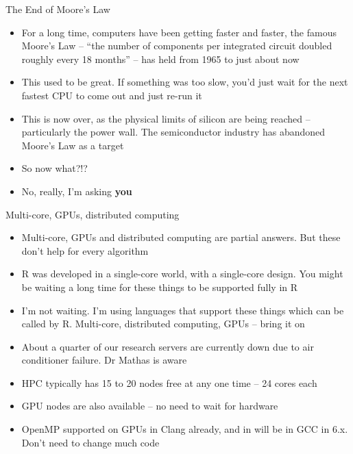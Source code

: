 \documentclass{beamer}
\begin{document}
\begin{frame}{The End of Moore's Law}
\begin{itemize}
\item For a long time, computers have been getting faster and faster, the famous
			Moore's Law -- ``the number of components per integrated circuit doubled roughly every 18 months'' -- 
			has held from 1965 to just about now
\item This used to be great. If something was too slow, you'd just wait for the next fastest CPU to come out
			and just re-run it
\item This is now over, as the physical limits of silicon are being reached -- particularly the power wall. 
			The semiconductor industry has abandoned Moore's Law as a target
\item So now what?!?
\item No, really, I'm asking \textbf{you}
\end{itemize}
\end{frame}

\begin{frame}{Multi-core, GPUs, distributed computing}
\begin{itemize}
\item Multi-core, GPUs and distributed computing are partial answers. But these don't help for every
			algorithm
\item R was developed in a single-core world, with a single-core design. You might be waiting a long time for
			these things to be supported fully in R
\item I'm not waiting. I'm using languages that support these things which can be called by R. Multi-core, 
			distributed computing, GPUs -- bring it on
\item About a quarter of our research servers are currently down due to air conditioner failure. Dr
			Mathas is aware
\item HPC typically has 15 to 20 nodes free at any one time -- 24 cores each
\item GPU nodes are also available -- no need to wait for hardware
\item OpenMP supported on GPUs in Clang already, and in will be in GCC in 6.x. Don't need to change much code
\end{itemize}
\end{frame}
\end{document}
